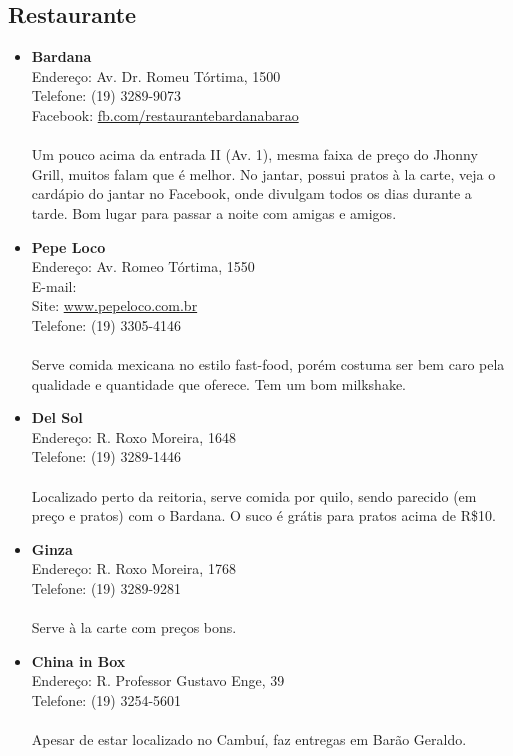 \subsection{Restaurante}

\begin{itemize}
\item \textbf{Bardana}
  \\Endereço: Av. Dr. Romeu Tórtima, 1500
  \\Telefone: (19) 3289-9073
  \\Facebook: \url{fb.com/restaurantebardanabarao}
  \\
  \\Um pouco acima da entrada II (Av. 1), mesma faixa de preço do Jhonny Grill,
  muitos falam que é melhor. No jantar, possui pratos à la carte, veja o
  cardápio do jantar no Facebook, onde divulgam todos os dias durante a tarde.
  Bom lugar para passar a noite com amigas e amigos.
\item \textbf{Pepe Loco}
  \\Endereço: Av. Romeo Tórtima, 1550
  \\E-mail: 
  \\Site: \url{www.pepeloco.com.br}
  \\Telefone: (19) 3305-4146
  \\
  \\Serve comida mexicana no estilo fast-food, porém costuma ser bem caro pela
  qualidade e quantidade que oferece. Tem um bom milkshake.
\item \textbf{Del Sol}
  \\Endereço: R. Roxo Moreira, 1648
  \\Telefone: (19) 3289-1446
  \\
  \\Localizado perto da reitoria, serve comida por quilo, sendo parecido (em
  preço e pratos) com o Bardana. O suco é grátis para pratos acima de R\$10.
\item \textbf{Ginza}
  \\Endereço: R. Roxo Moreira, 1768
  \\Telefone: (19) 3289-9281
  \\
  \\Serve à la carte com preços bons.
\item \textbf{China in Box}
  \\Endereço: R. Professor Gustavo Enge, 39
  \\Telefone: (19) 3254-5601
  \\
  \\Apesar de estar localizado no Cambuí, faz entregas em Barão Geraldo.

\end{itemize}
